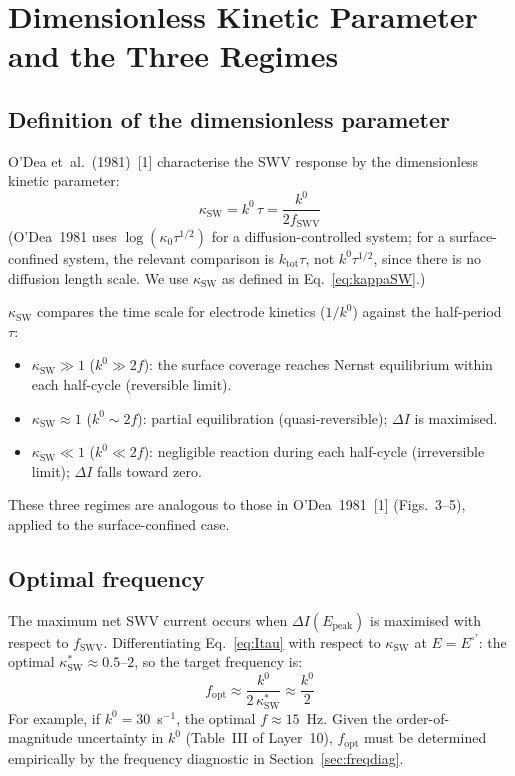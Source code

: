 \documentclass[10pt,a4paper]{article}
\numberwithin{equation}{section}
\newcommand{\cit}[1]{[#1]}
\newcommand{\Eo}{E^{\circ\prime}}
\newcommand{\DI}{\Delta I}
\begin{document}
\section{Dimensionless Kinetic Parameter and the Three Regimes}
\label{sec:kappa}

\subsection{Definition of the dimensionless parameter}

O'Dea et~al.~(1981)~\cit{1} characterise the SWV response by the
dimensionless kinetic parameter:
\begin{equation}
  \kappa_{\text{SW}} = k^0\,\tau = \frac{k^0}{2f_{\text{SWV}}}
  \label{eq:kappaSW}
\end{equation}
(O'Dea~1981 uses $\log(\kappa_0 \tau^{1/2})$ for a diffusion-controlled
system; for a surface-confined system, the relevant comparison is
$k_{\text{tot}}\tau$, not $k^0\tau^{1/2}$, since there is no diffusion
length scale. We use $\kappa_{\text{SW}}$ as defined in
Eq.~\eqref{eq:kappaSW}.)

$\kappa_{\text{SW}}$ compares the time scale for electrode kinetics
($1/k^0$) against the half-period $\tau$:
\begin{itemize}[nosep]
  \item $\kappa_{\text{SW}} \gg 1$ ($k^0 \gg 2f$): the surface coverage
    reaches Nernst equilibrium within each half-cycle (reversible limit).
  \item $\kappa_{\text{SW}} \approx 1$ ($k^0 \sim 2f$): partial equilibration
    (quasi-reversible); $\DI$ is maximised.
  \item $\kappa_{\text{SW}} \ll 1$ ($k^0 \ll 2f$): negligible reaction during
    each half-cycle (irreversible limit); $\DI$ falls toward zero.
\end{itemize}
These three regimes are analogous to those in O'Dea~1981~\cit{1} (Figs.~3--5),
applied to the surface-confined case.

\subsection{Optimal frequency}

The maximum net SWV current occurs when $\DI(E_{\text{peak}})$ is
maximised with respect to $f_{\text{SWV}}$. Differentiating
Eq.~\eqref{eq:Itau} with respect to $\kappa_{\text{SW}}$ at
$E = \Eo$: the optimal $\kappa_{\text{SW}}^* \approx 0.5$--$2$,
so the target frequency is:
\begin{equation}
  f_{\text{opt}} \approx \frac{k^0}{2\,\kappa_{\text{SW}}^*}
  \approx \frac{k^0}{2}
  \label{eq:fopt}
\end{equation}
For example, if $k^0 = 30$~s$^{-1}$, the optimal $f \approx 15$~Hz.
Given the order-of-magnitude uncertainty in $k^0$ (Table~III of Layer~10),
$f_{\text{opt}}$ must be determined empirically by the frequency
diagnostic in Section~\ref{sec:freqdiag}.
\end{document}

